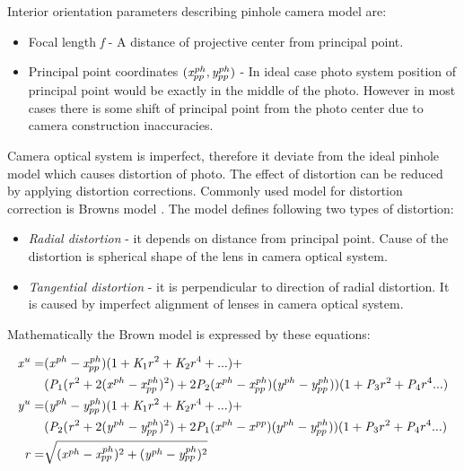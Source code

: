 \documentclass[a4paper,12pt]{article}
\newcommand{\escal}[1]{
{\it #1}
}
\newcommand{\term}[1]{
{\it #1}%
}
\begin{document}
Interior orientation parameters describing pinhole camera model are:
\begin{itemize}
  \item Focal length \escal{f} - A distance of projective center from principal point.
  \item Principal point coordinates $(\escal{x}^{ph}_{pp}, \escal{y}^{ph}_{pp})$ - In ideal case photo system position of principal point would be exactly in the middle 
	of the photo.  However in most cases there is some shift of principal point from the photo center due to
	camera construction inaccuracies.
\end{itemize}

Camera optical system is imperfect, therefore it deviate from the ideal pinhole model which 
 causes distortion of photo.
The effect of distortion can be reduced by applying distortion corrections. Commonly 
used model for distortion correction is Browns model \cite{brown1966distortion}.
The model defines following two types of distortion:
\begin{itemize}
  \item \term{Radial distortion} - it depends on distance from principal point. Cause of the distortion is spherical shape of the 
  lens in camera optical system.
  \item \term{Tangential distortion} - it is perpendicular to direction of radial distortion. It is caused by 
       imperfect alignment of lenses in camera optical system.
\end{itemize}

Mathematically the Brown model is expressed by these equations:

\begin{equation}
\label{eq:undistort}
\begin{split}
\escal{x}^{u} =& (\escal{x}^{ph} - \escal{x}^{ph}_{pp})(1 + \escal{K}_{1}r^2 + \escal{K}_2r^4 + ...) + \\
&(\escal{P}_1(\escal{r}^2 + 2(\escal{x}^{ph} - \escal{x}^{ph}_{pp})^2) + 2\escal{P}_2(\escal{x}^{ph} - \escal{x}^{ph}_{pp})(\escal{y}^{ph} - \escal{y}^{ph}_{pp}))(1 + \escal{P}_3r^2 + \escal{P}_4r^4 ...) \\
\escal{y}^{u} =& (\escal{y}^{ph} - \escal{y}^{ph}_{pp})(1 + \escal{K}_1r^2 + \escal{K}_2r^4 + ...) + \\
&(\escal{P}_2(\escal{r}^2 + 2(\escal{y}^{ph} - \escal{y}^{ph}_{pp})^2) + 2\escal{P}_1(\escal{x}^{ph} - \escal{x}^{pp})(y^{ph} - \escal{y}^{ph}_{pp}))(1 + \escal{P}_3r^2 + \escal{P}_4r^4 ...) \\
\escal{r} =& \sqrt{(\escal{x}^{ph} - \escal{x}^{ph}_{pp})^2 + (\escal{y}^{ph} - \escal{y}^{ph}_{pp})^2}
\end{split}
\end{equation}
\end{document}

